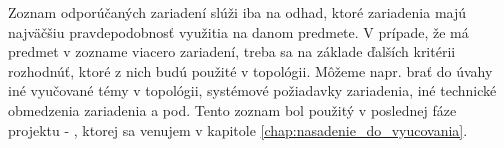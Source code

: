Zoznam odporúčaných zariadení slúži iba na odhad, ktoré zariadenia majú najväčšiu pravdepodobnosť využitia na danom predmete. V prípade, že má predmet v zozname viacero zariadení, treba sa na základe ďalších kritérii rozhodnúť, ktoré z nich budú použité v topológii. Môžeme napr. brať do úvahy iné vyučované témy v topológii, systémové požiadavky zariadenia, iné technické obmedzenia zariadenia a pod. Tento zoznam bol použitý v poslednej fáze projektu - , ktorej sa venujem v kapitole \ref{chap:nasadenie_do_vyucovania}.